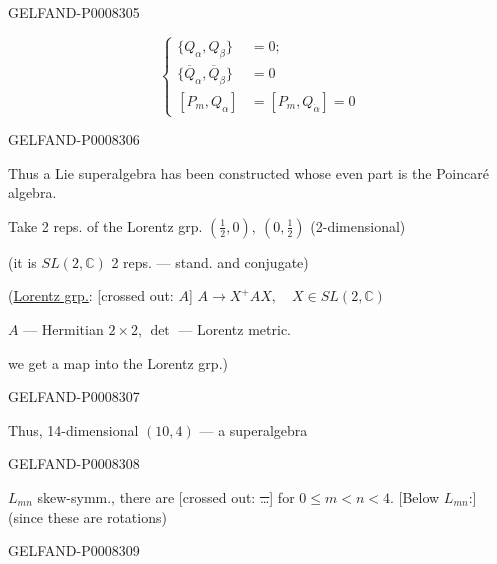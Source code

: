 \begin{GelfandAdjacentEvidence}{GELFAND-P000830}{5}


\begin{equation*}
\left\{\begin{aligned}
\{Q_\alpha,Q_\beta\}&=0;\\
\{\overline{Q}_\alpha,\overline{Q}_\beta\}&=0\\
[P_m,Q_\alpha]&=[P_m,Q_{\dot\alpha}]=0
\end{aligned}\right.\tag{1}
\end{equation*}
\end{GelfandAdjacentEvidence}
\begin{GelfandAdjacentEvidence}{GELFAND-P000830}{6}


Thus a Lie superalgebra has been constructed whose even part is the Poincaré algebra.

Take 2 reps. of the Lorentz grp. \(\left(\frac12,0\right),\ \left(0,\frac12\right)\) (2-dimensional)

(it is \(SL(2,\mathbb{C})\) 2 reps. — stand. and conjugate)

(\uline{Lorentz grp.}: [crossed out: \sout{\(A\)}]
\(A\to X^+AX,\quad X\in SL(2,\mathbb{C})\)

\(A\) — Hermitian \(2\times2\), \(\det\) — Lorentz metric.

we get a map into the Lorentz grp.)
\end{GelfandAdjacentEvidence}
\begin{GelfandAdjacentEvidence}{GELFAND-P000830}{7}


Thus, 14-dimensional \((10,4)\) — a superalgebra
\end{GelfandAdjacentEvidence}
\begin{GelfandAdjacentEvidence}{GELFAND-P000830}{8}


\(L_{mn}\) skew-symm., there are [crossed out: \sout{…}]
for \(0\le m<n<4\).
[Below \(L_{mn}\):] (since these are rotations)
\end{GelfandAdjacentEvidence}
\begin{GelfandAdjacentEvidence}{GELFAND-P000830}{9}


\end{GelfandAdjacentEvidence}


